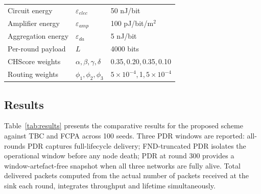 \documentclass[conference]{IEEEtran}
\begin{document}
\begin{table}[!t]
\begin{tabular}{lll}
\midrule
Circuit energy        & $\varepsilon_{elec}$         & 50 nJ/bit     \\
Amplifier energy      & $\varepsilon_{amp}$          & 100 pJ/bit/m$^2$ \\
Aggregation energy    & $\varepsilon_{da}$           & 5 nJ/bit      \\
Per-round payload     & $L$                          & 4000 bits     \\
\midrule
CHScore weights       & $\alpha,\beta,\gamma,\delta$ & 0.35,\,0.20,\,0.35,\,0.10 \\
Routing weights       & $\phi_1,\phi_2,\phi_3$      & $5{\times}10^{-4}$,\,1,\,$5{\times}10^{-4}$ \\
\bottomrule
\end{tabular}
\end{table}

\subsection{Results}

Table~\ref{tab:results} presents the comparative results for the
proposed scheme against TBC and FCPA across 100 seeds.
Three PDR windows are reported: all-rounds PDR captures full-lifecycle
delivery; FND-truncated PDR isolates the operational window before any
node death; PDR at round 300 provides a window-artefact-free snapshot
when all three networks are fully alive. Total delivered packets
computed from the actual number of packets received at the sink each
round, integrates throughput and lifetime simultaneously.

\begin{table}[!t]
\caption{Comparative Simulation Results (100 Seeds, $\kappa = 10$)}
\label{tab:results}
\renewcommand{\arraystretch}{1.2}
\centering
{}
\end{table}
\end{document}

